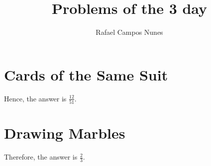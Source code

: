\documentclass[11pt]{article}
\author{Rafael Campos Nunes}
\date{}
\title{Problems of the 3 day}
\begin{document}
\maketitle
\tableofcontents


\section{Cards of the Same Suit}
\label{sec:org575a562}

Hence, the answer is  \(\frac{12}{51}\).

\section{Drawing Marbles}
\label{sec:org8e459c1}

Therefore, the answer is \(\frac{2}{3}\).
\end{document}
